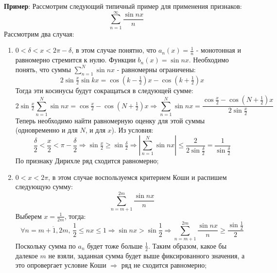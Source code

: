 \documentclass[12pt]{article}
\theoremstyle{definition}
\newcommand{\ddsum}[2]{\displaystyle\sum\limits_{#1}^{#2}}
\begin{document}
\textbf{Пример}: Рассмотрим следующий типичный пример для применения признаков:
$$
	\ddsum{n = 1}{\infty}\dfrac{\sin{nx}}{n}
$$
Рассмотрим два случая:
\begin{enumerate}[label={\arabic*)}]
	\item $0 < \delta < x < 2\pi - \delta$, в этом случае понятно, что $a_n(x) = \tfrac{1}{n}$ - монотонная и равномерно стремится к нулю. Функции $b_n(x) = \sin{nx}$. Необходимо понять, что суммы $\ddsum{n = 1}{N}\sin{nx}$ - равномерны ограничены:
	$$
		2\sin{\tfrac{x}{2}}\sin{kx} = \cos{\left(k - \tfrac{1}{2}\right)x} - \cos{\left(k +  \tfrac{1}{2}\right)x} 
	$$
	Тогда эти косинусы будут сокращаться в следующей сумме:
	$$
		2\sin{\tfrac{x}{2}}\ddsum{n = 1}{N}\sin{nx} = \cos{\tfrac{x}{2}} - \cos{\left(N+\tfrac{1}{2}\right)x} \Rightarrow \ddsum{n = 1}{N}\sin{nx} = \dfrac{\cos{\tfrac{x}{2}} - \cos{\left(N+\tfrac{1}{2}\right)x}}{2\sin{\tfrac{x}{2}}}
	$$
	Теперь необходимо найти равномерную оценку для этой суммы (одновременно и для $N$, и для $x$). Из условия:
	$$
		\dfrac{\delta}{2} < \dfrac{x}{2} < \pi - \dfrac{\delta}{2} \Rightarrow \sin{\tfrac{x}{2}} \geq \sin{\tfrac{\delta}{2}} \Rightarrow \left|\ddsum{n = 1}{N}\sin{nx}\right| \leq \dfrac{2}{2\sin{\tfrac{\delta}{2}}} = \dfrac{1}{\sin{\tfrac{\delta}{2}}}
	$$
	По признаку Дирихле ряд сходится равномерно;
	\item $0 < x <2\pi$, в этом случае воспользуемся критерием Коши и распишем следующую сумму:
	$$
		\ddsum{n = m+1}{2m}\dfrac{\sin{nx}}{n}
	$$
	Выберем $x = \tfrac{1}{2m}$, тогда:
	$$
		\forall n = \overline{m + 1, 2m}, \, \dfrac{1}{2} \leq nx \leq 1 \Rightarrow  \sin{nx} > \sin{\dfrac{1}{2}} \Rightarrow \ddsum{n = m+1}{2m}\dfrac{\sin{nx}}{n} \geq \dfrac{\sin{\tfrac{1}{2}}}{2}
	$$
	Поскольку сумма по $a_n$ будет тоже больше $\tfrac{1}{2}$. Таким образом, какое бы далекое $m$ не взяли, заданная сумма будет выше фиксированного значения, а это опровергает условие Коши $\Rightarrow$ ряд не сходится равномерно;
		
\end{enumerate}
\end{document}
